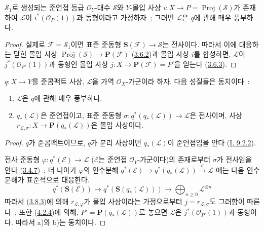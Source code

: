 \begin{corollary}[4.4.3]
\label{II.4.4.3-ko}
$\mathcal{S}_1$로 생성되는 준연접 등급 $\mathcal{O}_Y$-대수
$\mathcal{S}$와 $Y$-몰입 사상
$i:X\to P=\operatorname{Proj}(\mathcal{S})$가 존재하여
$\mathcal{L}$이 $i^*(\mathcal{O}_P(1))$과 동형이라고 가정하자~;
그러면 $\mathcal{L}$은 $q$에 관해 매우 풍부하다.
\end{corollary}

\begin{proof}
실제로 $\mathcal{F}=\mathcal{S}_1$이면 표준 준동형
$\mathbf{S}(\mathcal{F})\to\mathcal{S}$는 전사이다. 따라서 이에
대응하는 닫힌 몰입 사상
$\operatorname{Proj}(\mathcal{S})\to\mathbf{P}(\mathcal{F})$
(\hyperref[II.3.6.2-ko]{3.6.2})과 몰입 사상 $i$를 합성하면,
$\mathcal{L}$이 $j^*(\mathcal{O}_{P'}(1))$과 동형인 몰입 사상
$j:X\to\mathbf{P}(\mathcal{F})=P'$을 얻는다
(\hyperref[II.3.6.3-ko]{3.6.3}).
\end{proof}

\begin{proposition}[4.4.4]
\label{II.4.4.4-ko}
$q:X\to Y$를 준콤팩트 사상, $\mathcal{L}$을 가역
$\mathcal{O}_X$-가군이라 하자. 다음 성질들은 동치이다~:
\begin{enumerate}
  \item[\rm{a)}] $\mathcal{L}$은 $q$에 관해 매우 풍부하다.
  \item[\rm{b)}] $q_*(\mathcal{L})$은 준연접이고, 표준 준동형
  $\sigma:q^*(q_*(\mathcal{L}))\to\mathcal{L}$은 전사이며, 사상
  $r_{\mathcal{L},\sigma}:X\to\mathbf{P}(q_*(\mathcal{L}))$은 몰입
  사상이다.
\end{enumerate}
\end{proposition}

\begin{proof}
$q$가 준콤팩트이므로, $q$가 분리 사상이면 $q_*(\mathcal{L})$이
준연접임을 안다 (\hyperref[I.9.2.2-ko]{I, 9.2.2}).


전사 준동형 $\varphi:q^*(\mathcal{E})\to\mathcal{L}$
($\mathcal{E}$는 준연접 $\mathcal{O}_Y$-가군이다)의 존재로부터
$\sigma$가 전사임을 안다 (\hyperref[II.3.4.7-ko]{3.4.7})~; 더 나아가
$\varphi$의 인수분해
$q^*(\mathcal{E})\to q^*(q_*(\mathcal{L}))\xrightarrow{\sigma}\mathcal{L}$
에는 다음 인수분해가 표준적으로 대응한다.
\[
  q^*(\mathbf{S}(\mathcal{E}))
    \longrightarrow q^*(\mathbf{S}(q_*(\mathcal{L})))
    \longrightarrow\bigoplus_{n\geq0}\mathcal{L}^{\otimes n}
\]
따라서 (\hyperref[II.3.8.3-ko]{3.8.3})에 의해
$r_{\mathcal{L},\varphi}$가 몰입 사상이라는 가정으로부터
$j=r_{\mathcal{L},\sigma}$도 그러함이 따른다~; 또한
(\hyperref[II.4.2.4-ko]{4.2.4})에 의해,
$P'=\mathbf{P}(q_*(\mathcal{L}))$로 놓으면 $\mathcal{L}$은
$j^*(\mathcal{O}_{P'}(1))$과 동형이다. 따라서 a)와 b)는 동치이다.
\end{proof}

